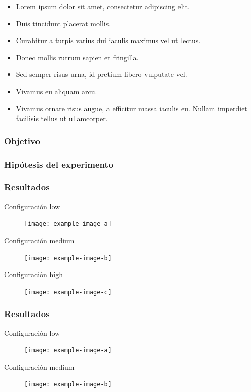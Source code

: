 \begin{itemize}
    \item  Lorem ipsum dolor sit amet, consectetur adipiscing elit. 
    \item Duis tincidunt placerat mollis. 
    \item Curabitur a turpis varius dui iaculis maximus vel ut lectus. 
    \item Donec mollis rutrum sapien et fringilla.
    \item Sed semper risus urna, id pretium libero vulputate vel. 
    \item Vivamus eu aliquam arcu. 
    \item Vivamus ornare risus augue, a efficitur massa iaculis eu. Nullam imperdiet facilisis tellus ut ullamcorper. 
\end{itemize}
\subsubsection{Objetivo}
\subsubsection{Hipótesis del experimento}
\subsubsection{Resultados}

Configuración low
\begin{figure}[H]
    \centering
    \texttt{[image: example-image-a]}
\end{figure}


Configuración medium
\begin{figure}[H]
    \centering
    \texttt{[image: example-image-b]}
\end{figure}

Configuración high
\begin{figure}[H]
    \centering
    \texttt{[image: example-image-c]}
\end{figure}

\subsubsection{Resultados}

Configuración low
\begin{figure}[H]
    \centering
    \texttt{[image: example-image-a]}
\end{figure}


Configuración medium
\begin{figure}[H]
    \centering
    \texttt{[image: example-image-b]}
\end{figure}

